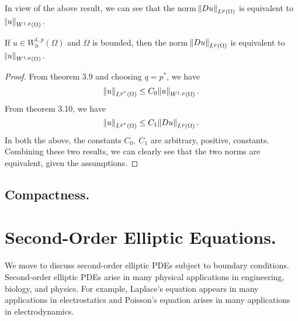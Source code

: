 \documentclass[10pt]{article}
\begin{document}
In view of the above result, we can see that the norm $\norm{Du}_{L^p(\Omega)}$ is equivalent to $\norm{u}_{W^{1,p}(\Omega)}$.
\begin{lemma}
	If $u \in W_0^{1,p}(\Omega)$ and $\Omega$ is bounded, then the norm $\norm{Du}_{L^p(\Omega)}$ is equivalent to $\norm{u}_{W^{1,p}(\Omega)}$.
\end{lemma}
\begin{proof}
	From theorem 3.9 and choosing $q = p^*$, we have
	\begin{equation*}
		\displaystyle \norm{u}_{L^{p^*}(\Omega)} \leq C_0\norm{u}_{W^{1,p}(\Omega)}.
	\end{equation*}
	From theorem 3.10, we have 
	\begin{equation*}
		\displaystyle \norm{u}_{L^{p^*}(\Omega)} \leq C_1\norm{Du}_{L^p(\Omega)}. 
	\end{equation*}
	In both the above, the constants $C_0, \: C_1$ are arbitrary, positive, constants. Combining these two results, we can clearly see that the two norms are equivalent, given the assumptions. 
\end{proof}

\subsection{Compactness.}
\section{Second-Order Elliptic Equations.}
We move to discuss second-order elliptic PDEs subject to boundary conditions. Second-order elliptic PDEs arise in many physical applications in engineering, biology, and physics. For example, Laplace's equation appears in many applications in electrostatics and Poisson's equation arises in many applications in electrodynamics. 
\end{document}
